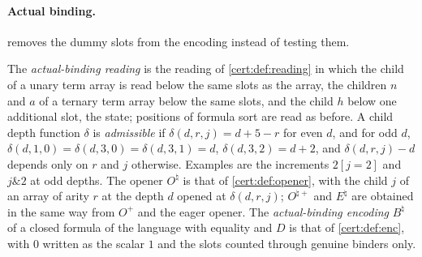 \paragraph{Actual binding.}  removes the dummy slots from the
encoding instead of testing them.

\begin{definition}\label{cert:def:actual}
The \emph{actual-binding reading} is the reading of \cref{cert:def:reading} in which the
child of a unary term array is read below the same slots as the array, the children $n$
and $a$ of a ternary term array below the same slots, and the child $h$ below one
additional slot, the state; positions of formula sort are read as before. A child depth
function $\delta$ is \emph{admissible} if $\delta(d,r,j)=d+5-r$ for even $d$, and for
odd $d$, $\delta(d,1,0)=\delta(d,3,0)=\delta(d,3,1)=d$, $\delta(d,3,2)=d+2$, and
$\delta(d,r,j)-d$ depends only on $r$ and $j$ otherwise. Examples are the increments
$2[j=2]$ and $j\mathbin{\&}2$ at odd depths. The opener $O^{\natural}$ is that of
\cref{cert:def:opener}, with the child $j$ of an array of arity $r$ at the depth $d$
opened at $\delta(d,r,j)$; $O^{\natural+}$ and $E^{\natural}$ are obtained in the same way
from $O^{+}$ and the eager opener. The \emph{actual-binding encoding} $B^{\natural}$ of a
closed formula of the language with equality and $D$ is that of \cref{cert:def:enc},
with $0$ written as the scalar $1$ and the slots counted through genuine binders only.
\end{definition}

